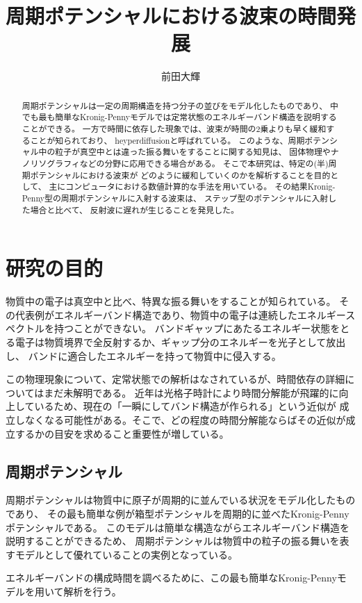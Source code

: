 \documentclass[autodetect-engine,dvipdfmx-if-dvi,ja=standard,a4paper,layout=v2]{bxjsreport}
\author{前田大輝}
\title{周期ポテンシャルにおける波束の時間発展}
\begin{document}
    \maketitle
    \begin{abstract}
      周期ポテンシャルは一定の周期構造を持つ分子の並びをモデル化したものであり、
      中でも最も簡単なKronig-Pennyモデルでは定常状態のエネルギーバンド構造を説明することができる。
      一方で時間に依存した現象では、波束が時間の2乗よりも早く緩和することが知られており、
      heyperdiffusionと呼ばれている。
      このような、周期ポテンシャル中の粒子が真空中とは違った振る舞いをすることに関する知見は、
      固体物理やナノリソグラフィなどの分野に応用できる場合がある。
      そこで本研究は、特定の(半)周期ポテンシャルにおける波束が
      どのように緩和していくのかを解析することを目的として、
      主にコンピュータにおける数値計算的な手法を用いている。
      その結果Kronig-Penny型の周期ポテンシャルに入射する波束は、
      ステップ型のポテンシャルに入射した場合と比べて、
      反射波に遅れが生じることを発見した。
    \end{abstract}
    \tableofcontents
    \chapter{研究の目的}
    \begin{chapterabstract}
      物質中の電子は真空中と比べ、特異な振る舞いをすることが知られている。
      その代表例がエネルギーバンド構造であり、物質中の電子は連続したエネルギースペクトルを持つことができない。
      バンドギャップにあたるエネルギー状態をとる電子は物質境界で全反射するか、ギャップ分のエネルギーを光子として放出し、
      バンドに適合したエネルギーを持って物質中に侵入する。\par
      この物理現象について、定常状態での解析はなされているが、時間依存の詳細についてはまだ未解明である。
      近年は光格子時計により時間分解能が飛躍的に向上しているため、現在の「一瞬にしてバンド構造が作られる」という近似が
      成立しなくなる可能性がある。そこで、どの程度の時間分解能ならばその近似が成立するかの目安を求めること重要性が増している。\par
    \end{chapterabstract}
    \section{周期ポテンシャル}
    周期ポテンシャルは物質中に原子が周期的に並んでいる状況をモデル化したものであり、
    その最も簡単な例が箱型ポテンシャルを周期的に並べたKronig-Pennyポテンシャルである。
    このモデルは簡単な構造ながらエネルギーバンド構造を説明することができるため、
    周期ポテンシャルは物質中の粒子の振る舞いを表すモデルとして優れていることの実例となっている。\par
    エネルギーバンドの構成時間を調べるために、この最も簡単なKronig-Pennyモデルを用いて解析を行う。
\end{document}

